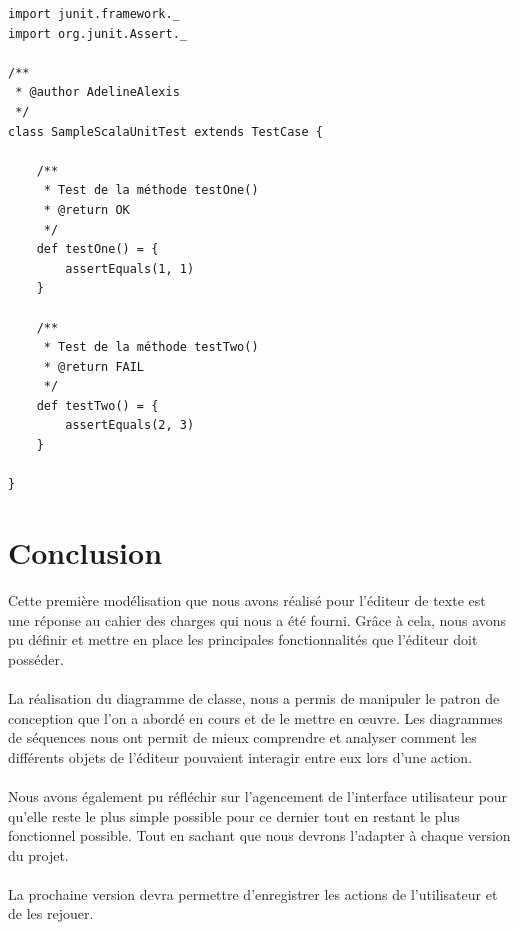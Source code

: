 \documentclass[a4paper,11pt]{article}
\begin{document}
\newpage
\begin{lstlisting}[caption=Exemple de TU Scala, label=java]
import junit.framework._
import org.junit.Assert._

/**
 * @author AdelineAlexis
 */
class SampleScalaUnitTest extends TestCase {

	/**
	 * Test de la méthode testOne()
	 * @return OK
	 */
	def testOne() = {
		assertEquals(1, 1)
	}

	/**
	 * Test de la méthode testTwo()
	 * @return FAIL
	 */
	def testTwo() = {
		assertEquals(2, 3)
	}

}

\end{lstlisting}	



\newpage
\section{Conclusion}
Cette première modélisation que nous avons réalisé pour l'éditeur de texte est une réponse au cahier des charges qui nous a été fourni. Grâce à cela, nous avons pu définir et mettre en place les principales fonctionnalités que l'éditeur doit posséder. 

\paragraph{}
La réalisation du diagramme de classe, nous a permis de manipuler le patron de conception que l'on a abordé en cours et de le mettre en œuvre. Les diagrammes de séquences nous ont permit de mieux comprendre et analyser comment les différents objets de l'éditeur pouvaient interagir entre eux lors d'une action. 

\paragraph{}
Nous avons également pu réfléchir sur l'agencement de l'interface utilisateur pour qu'elle reste le plus simple possible pour ce dernier tout en restant le plus fonctionnel possible. Tout en sachant que nous devrons l'adapter à chaque version du projet. 

\paragraph{}
La prochaine version devra permettre d'enregistrer les actions de l'utilisateur et de les rejouer. 


\newpage
\listoffigures  %
\listoftables
\newpage
\nocite{*}
\newpage
\end{document}
